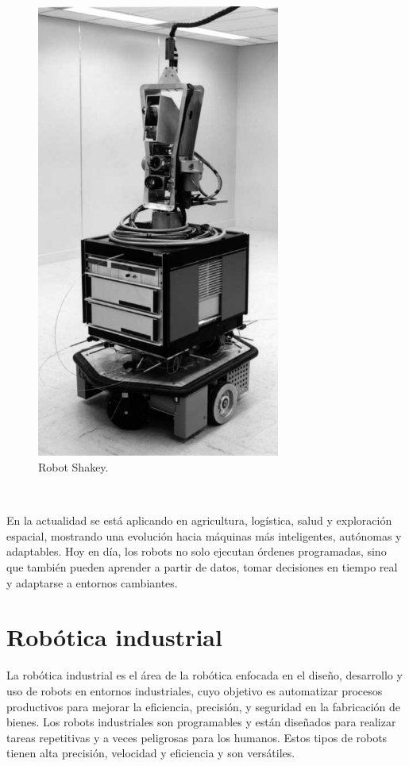 \begin{figure} [h!]
  \begin{center}
    \includegraphics[width=8cm]{figs/shakey}
  \end{center}
  \caption{Robot Shakey.}
  \label{fig:shakey}
\end{figure}\

En la actualidad se está aplicando en agricultura, logística, salud y exploración espacial, mostrando una evolución hacia máquinas más inteligentes, autónomas y adaptables. Hoy en día, los robots no solo ejecutan órdenes programadas, sino que también pueden aprender a partir de datos, tomar decisiones en tiempo real y adaptarse a entornos cambiantes. \\





\section{Robótica industrial}
\label{sec:segundaseccion}

La robótica industrial es el área de la robótica enfocada en el diseño, desarrollo y uso de robots en entornos industriales, cuyo objetivo es automatizar procesos productivos para mejorar la eficiencia, precisión, y seguridad en la fabricación de bienes. Los robots industriales son programables y están diseñados para realizar tareas repetitivas y a veces peligrosas para los humanos. Estos tipos de robots tienen alta precisión, velocidad y eficiencia y son versátiles. \\ \\ \\


